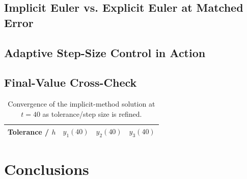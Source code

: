 \documentclass[11pt]{article}
\begin{document}
\subsection{Implicit Euler vs. Explicit Euler at Matched Error}

\subsection{Adaptive Step-Size Control in Action}

\subsection{Final-Value Cross-Check}
\begin{table}[h]
\centering
\begin{tabular}{@{}lccc@{}}
\toprule
Tolerance / $h$ & $y_1(40)$ & $y_2(40)$ & $y_3(40)$ \\
\midrule
\bottomrule
\end{tabular}
\caption{Convergence of the implicit-method solution at $t=40$ as tolerance/step size is refined.}
\label{tab:final-value}
\end{table}

\section{Conclusions}
\end{document}
